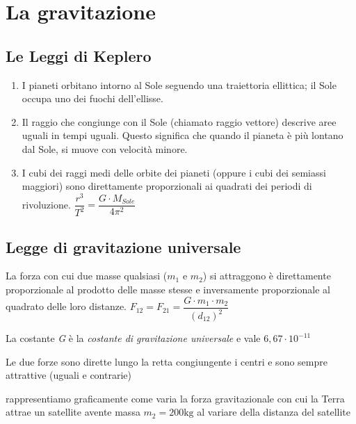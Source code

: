 \section{La gravitazione}
	\subsection{Le Leggi di Keplero}
		\begin{enumerate}
			\item I pianeti orbitano intorno al Sole seguendo una traiettoria ellittica; il Sole occupa uno dei fuochi dell'ellisse.
			\item Il raggio che congiunge con il Sole (chiamato raggio vettore) descrive aree uguali in tempi uguali. Questo significa che quando il pianeta è più lontano dal Sole, si muove con velocità minore.
			\item I cubi dei raggi medi delle orbite dei pianeti (oppure i cubi dei semiassi maggiori) sono direttamente proporzionali ai quadrati dei periodi di rivoluzione.
			$\dfrac{r^3}{T^2}=\dfrac{G \cdot M_{Sole}}{4\pi^2}$
		\end{enumerate}
		\subsection{Legge di gravitazione universale}
			\par La forza con cui due masse qualsiasi ($m_1$ e $m_2$) si attraggono è direttamente proporzionale al prodotto delle masse stesse e inversamente proporzionale al quadrato delle loro distanze.
			\begin{math}
			F_{12}=F_{21}=\dfrac{G \cdot m_1 \cdot m_2}{(d_{12})^2}
			\end{math}
			\par La costante \textit{G} è la \textit{costante di gravitazione universale} e vale $6,67 \cdot 10^{-11}$
			\par Le due forze sono dirette lungo la retta congiungente i centri e sono sempre attrattive (uguali e contrarie)
			\par \esempio rappresentiamo graficamente come varia la forza gravitazionale con cui la Terra attrae un satellite avente massa $m_2=200\textrm{kg}$ al variare della distanza del satellite
			\begin{center}
				\par
				\par
			\end{center}
